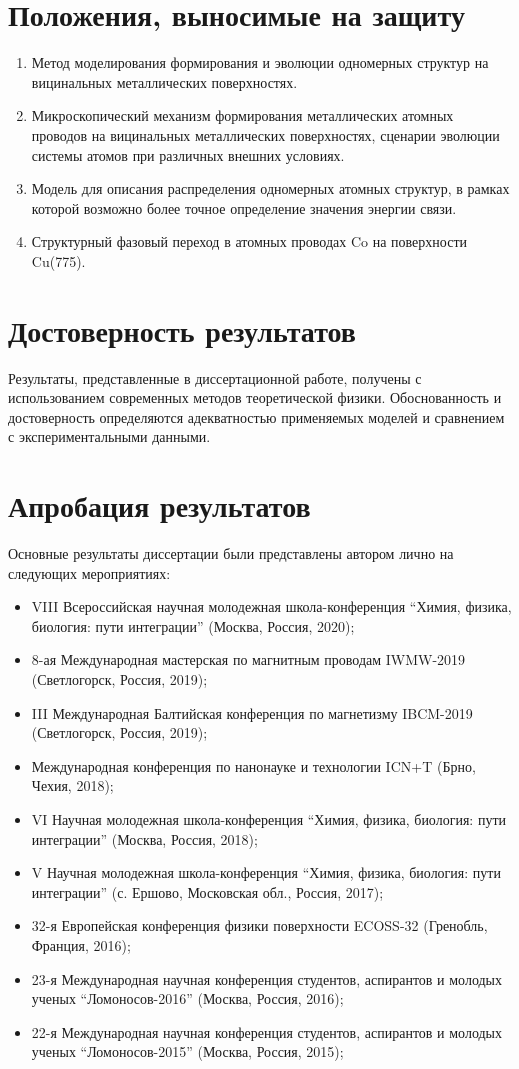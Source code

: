 \documentclass[10pt]{book}
\begin{document}
\section{Положения, выносимые на защиту}
\begin{enumerate}
\item Метод моделирования формирования и эволюции одномерных структур на вицинальных металлических поверхностях.
\item Микроскопический механизм формирования металлических атомных проводов на вицинальных металлических поверхностях, сценарии эволюции системы атомов при различных внешних условиях.
\item Модель для описания распределения одномерных атомных структур, в рамках которой возможно более точное определение значения энергии связи.
\item Структурный фазовый переход в атомных проводах Co на поверхности Cu(775).
\end{enumerate}

\section{Достоверность результатов}
Результаты, представленные в диссертационной работе, получены с использованием  современных методов теоретической физики. Обоснованность и достоверность определяются адекватностью применяемых моделей и сравнением с экспериментальными данными.

\section{Апробация результатов}
Основные результаты диссертации были представлены автором лично на следующих мероприятиях:
\begin{itemize}[nosep]
\item VIII Всероссийская научная молодежная школа-конференция ``Химия, физика, биология: пути интеграции'' (Москва, Россия, 2020);
\item 8-ая Международная мастерская по магнитным проводам IWMW-2019 (Светлогорск, Россия, 2019);
\item III Международная Балтийская конференция по магнетизму IBCM-2019 (Светлогорск, Россия, 2019);
\item Международная конференция по нанонауке и технологии ICN+T (Брно, Чехия, 2018);
\item VI Научная молодежная школа-конференция ``Химия, физика, биология: пути интеграции'' (Москва, Россия, 2018);
\item V Научная молодежная школа-конференция ``Химия, физика, биология: пути интеграции'' (с. Ершово, Московская обл., Россия, 2017);
\item 32-я Европейская конференция физики поверхности ECOSS-32 (Гренобль, Франция, 2016);
\item 23-я Международная научная конференция студентов, аспирантов и молодых ученых ``Ломоносов-2016'' (Москва, Россия, 2016);
\item 22-я Международная научная конференция студентов, аспирантов и молодых ученых ``Ломоносов-2015'' (Москва, Россия, 2015);
\end{itemize}
\end{document}
